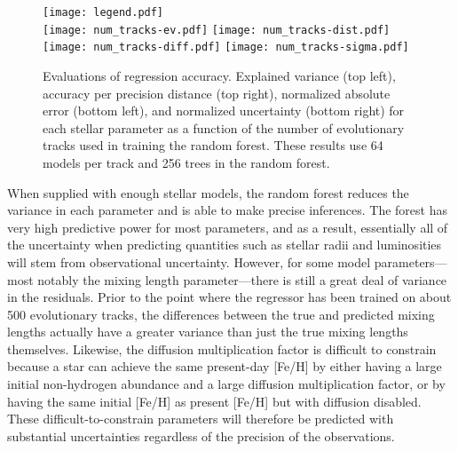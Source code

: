 \documentclass[manuscript,linenumbers]{aastex6}
\newif\ifref
\newcommand{\mb}[1]{\ifref\boldmath\textbf{#1}\unboldmath\else #1\fi}
\begin{document}
\begin{figure*}
    \centering
    \texttt{[image: legend.pdf]}\\
    \texttt{[image: num\_tracks-ev.pdf]}\hfill
    \texttt{[image: num\_tracks-dist.pdf]}\\
    \texttt{[image: num\_tracks-diff.pdf]}\hfill
    \texttt{[image: num\_tracks-sigma.pdf]}\\
    \caption{Evaluations of regression accuracy. Explained variance (top left), accuracy per precision distance (top right), normalized absolute error (bottom left), and normalized uncertainty (bottom right) for each stellar parameter as a function of the number of evolutionary tracks used in training the random forest. These results use 64 models per track and 256 trees in the random forest. } 
    \label{fig:evaluation-tracks}
\end{figure*}

When supplied with enough \mb{stellar models}, the random forest reduces the variance in each parameter and is able to make precise inferences. The forest has very high predictive power for most \mb{parameters}, and as a result, essentially all of the uncertainty when predicting quantities such as stellar radii and luminosities will stem from observational uncertainty. However, for some model \mb{parameters}---most notably the mixing length parameter---there is still a great deal of variance in the residuals. Prior to \mb{the point where the regressor has been trained on} about 500 evolutionary tracks, the differences between the true and predicted mixing lengths actually have a greater variance than just the true mixing lengths themselves. Likewise, the diffusion multiplication factor is difficult to constrain because a star can achieve the same present-day [Fe/H] by either having a large initial non-hydrogen abundance and a large diffusion \mb{multiplication} factor, or by having the same initial [Fe/H] as present [Fe/H] but with diffusion disabled. These difficult-to-constrain \mb{parameters} will therefore be predicted with substantial \mb{uncertainties} regardless of the precision of the observations. 

\end{document}
